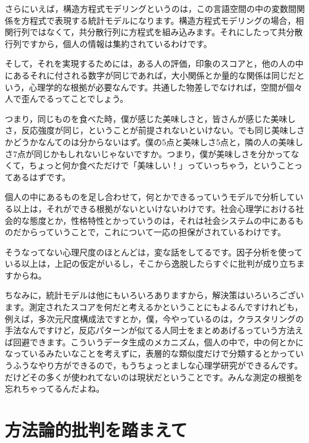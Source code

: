 \documentclass{ltjsbook}
\begin{document}
さらにいえば，構造方程式モデリングというのは，この言語空間の中の変数間関係を方程式で表現する統計モデルになります。構造方程式モデリングの場合，相関行列ではなくて，共分散行列に方程式を組み込みます。それにしたって共分散行列ですから，個人の情報は集約されているわけです。

そして，それを実現するためには，ある人の評価，印象のスコアと，他の人の中にあるそれに付される数字が同じであれば，大小関係とか量的な関係は同じだという，心理学的な根拠が必要なんです。共通した物差しでなければ，空間が個々人で歪んでるってことでしょう。

つまり，同じものを食べた時，僕が感じた美味しさと，皆さんが感じた美味しさ，反応強度が同じ，ということが前提されないといけない。でも同じ美味しさかどうかなんてのは分からないはず。僕の5点と美味しさ5点と，隣の人の美味しさ7点が同じかもしれないじゃないですか。つまり，僕が美味しさを分かってなくて，ちょっと何か食べただけで「美味しい！」っていっちゃう，ということってあるはずです。

個人の中にあるものを足し合わせて，何とかできるっていうモデルで分析している以上は，それができる根拠がないといけないわけです。社会心理学における社会的な態度とか，性格特性とかっていうのは，それは社会システムの中にあるものだからっていうことで，これについて一応の担保がされているわけです。

そうなってない心理尺度のほとんどは，変な話をしてるです。因子分析を使っている以上は，上記の仮定がいるし，そこから逸脱したらすぐに批判が成り立ちますからね。

ちなみに，統計モデルは他にもいろいろありますから，解決策はいろいろございます。測定されたスコアを何だと考えるかということにもよるんですけれども，例えば，多次元尺度構成法ですとか，僕，今やっているのは，クラスタリングの手法なんですけど，反応パターンが似てる人同士をまとめあげるっていう方法えば回避できます。こういうデータ生成のメカニズム，個人の中で，中の何とかになっているみたいなことを考えずに，表層的な類似度だけで分類するとかっていうふうなやり方ができるので，もうちょっとましな心理学研究ができるんです。だけどその多くが使われてないのは現状だということです。みんな測定の根拠を忘れちゃってるんだよね。

\section{方法論的批判を踏まえて}
\end{document}
